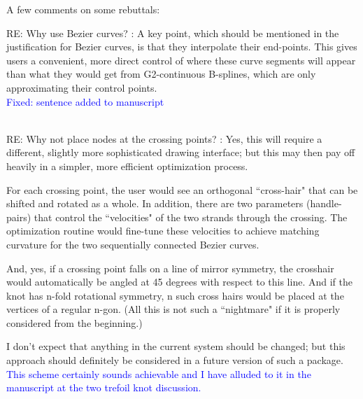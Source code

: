 \documentclass[12pt]{article}
\begin{document}
A few comments on some rebuttals:

RE: Why use Bezier curves? : A key point, which should be mentioned in
the justification for Bezier curves, is that they interpolate their
end-points. This gives users a convenient, more direct control of
where these curve segments will appear than what they would get from
G2-continuous B-splines, which are only approximating their control
points.\textcolor{blue}{\\Fixed: sentence added to manuscript\\ \\}

RE: Why not place nodes at the crossing points? : Yes, this will
require a different, slightly more sophisticated drawing interface;
but this may then pay off heavily in a simpler, more efficient
optimization process.

For each crossing point, the user would see an orthogonal ``cross-hair"
that can be shifted and rotated as a whole.  In addition, there are
two parameters (handle-pairs) that control the ``velocities" of the two
strands through the crossing.  The optimization routine would
fine-tune these velocities to achieve matching curvature for the two
sequentially connected Bezier curves.

And, yes, if a crossing point falls on a line of mirror symmetry, the
crosshair would automatically be angled at 45 degrees with respect to
this line.  And if the knot has n-fold rotational symmetry, n such
cross hairs would be placed at the vertices of a regular n-gon.  (All
this is not such a ``nightmare" if it is properly considered from the
beginning.)

I don't expect that anything in the current system should be changed;
but this approach should definitely be considered in a future version
of such a package.
\textcolor{blue}{\\ This scheme certainly sounds achievable and I have
  alluded to it in the manuscript at the two trefoil knot
  discussion.\\ \\}
\end{document}
